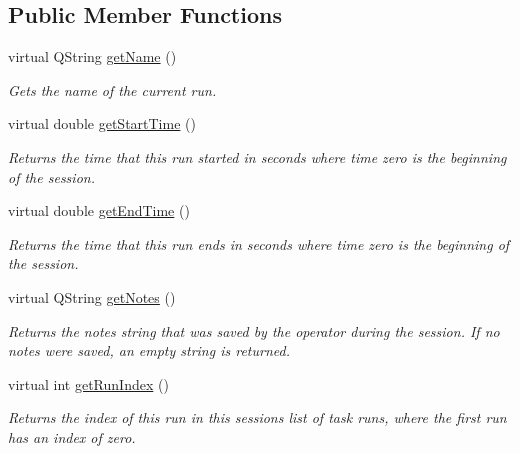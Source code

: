 \subsection*{Public Member Functions}
\begin{DoxyCompactItemize}
\item 
virtual Q\-String \hyperlink{class_picto_1_1_live_run_notes_reader_a6b14e378550b593fca52e72070e7a65a}{get\-Name} ()
\begin{DoxyCompactList}\small\item\em Gets the name of the current run. \end{DoxyCompactList}\item 
\hypertarget{class_picto_1_1_live_run_notes_reader_ad82e85752897275d0b5be8fced936e05}{virtual double \hyperlink{class_picto_1_1_live_run_notes_reader_ad82e85752897275d0b5be8fced936e05}{get\-Start\-Time} ()}\label{class_picto_1_1_live_run_notes_reader_ad82e85752897275d0b5be8fced936e05}

\begin{DoxyCompactList}\small\item\em Returns the time that this run started in seconds where time zero is the beginning of the session. \end{DoxyCompactList}\item 
\hypertarget{class_picto_1_1_live_run_notes_reader_aedd3a7ccc6a2eb6d0d7fa2e849c94559}{virtual double \hyperlink{class_picto_1_1_live_run_notes_reader_aedd3a7ccc6a2eb6d0d7fa2e849c94559}{get\-End\-Time} ()}\label{class_picto_1_1_live_run_notes_reader_aedd3a7ccc6a2eb6d0d7fa2e849c94559}

\begin{DoxyCompactList}\small\item\em Returns the time that this run ends in seconds where time zero is the beginning of the session. \end{DoxyCompactList}\item 
\hypertarget{class_picto_1_1_live_run_notes_reader_a5ea02e64056eb67c49f65a19a60437cf}{virtual Q\-String \hyperlink{class_picto_1_1_live_run_notes_reader_a5ea02e64056eb67c49f65a19a60437cf}{get\-Notes} ()}\label{class_picto_1_1_live_run_notes_reader_a5ea02e64056eb67c49f65a19a60437cf}

\begin{DoxyCompactList}\small\item\em Returns the notes string that was saved by the operator during the session. If no notes were saved, an empty string is returned. \end{DoxyCompactList}\item 
\hypertarget{class_picto_1_1_live_run_notes_reader_a38eb36ed22f831c011a3ef59acb327b6}{virtual int \hyperlink{class_picto_1_1_live_run_notes_reader_a38eb36ed22f831c011a3ef59acb327b6}{get\-Run\-Index} ()}\label{class_picto_1_1_live_run_notes_reader_a38eb36ed22f831c011a3ef59acb327b6}

\begin{DoxyCompactList}\small\item\em Returns the index of this run in this sessions list of task runs, where the first run has an index of zero. \end{DoxyCompactList}\end{DoxyCompactItemize}


